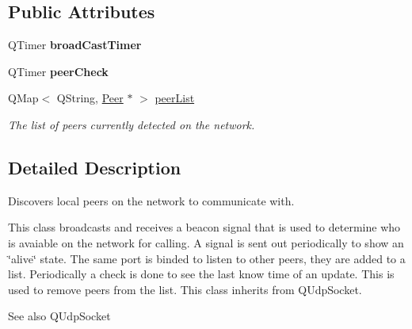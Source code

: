 \subsection*{\-Public \-Attributes}
\begin{DoxyCompactItemize}
\item 
\hypertarget{class_network_discover_a82d0981a5c6c1acecd85a0e210b631f2}{
\-Q\-Timer {\bfseries broad\-Cast\-Timer}}
\label{class_network_discover_a82d0981a5c6c1acecd85a0e210b631f2}

\item 
\hypertarget{class_network_discover_ad23e0a7d95e0fed29acae8f193dfcfc3}{
\-Q\-Timer {\bfseries peer\-Check}}
\label{class_network_discover_ad23e0a7d95e0fed29acae8f193dfcfc3}

\item 
\hypertarget{class_network_discover_ac7f0c8a7a8e780c83c24b4fa8cbbbfef}{
\-Q\-Map$<$ \-Q\-String, \hyperlink{class_peer}{\-Peer} $\ast$ $>$ \hyperlink{class_network_discover_ac7f0c8a7a8e780c83c24b4fa8cbbbfef}{peer\-List}}
\label{class_network_discover_ac7f0c8a7a8e780c83c24b4fa8cbbbfef}

\begin{DoxyCompactList}\small\item\em \-The list of peers currently detected on the network. \end{DoxyCompactList}\end{DoxyCompactItemize}


\subsection{\-Detailed \-Description}
\-Discovers local peers on the network to communicate with. 

\-This class broadcasts and receives a beacon signal that is used to determine who is avaiable on the network for calling. \-A signal is sent out periodically to show an \char`\"{}alive\char`\"{} state. \-The same port is binded to listen to other peers, they are added to a list. \-Periodically a check is done to see the last know time of an update. \-This is used to remove peers from the list. \-This class inherits from \-Q\-Udp\-Socket. \begin{DoxySeeAlso}{\-See also}
\-Q\-Udp\-Socket 
\end{DoxySeeAlso}


